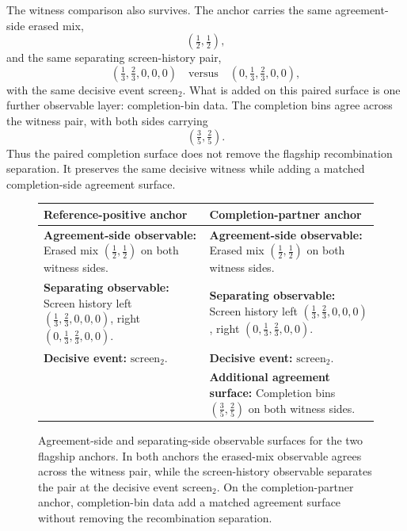 \documentclass[11pt]{article}
\theoremstyle{definition}
\begin{document}
The witness comparison also survives. The anchor carries the same agreement-side erased mix,
\[
(\tfrac12,\tfrac12),
\]
and the same separating screen-history pair,
\[
(\tfrac13,\tfrac23,0,0,0)
\quad\text{versus}\quad
(0,\tfrac13,\tfrac23,0,0),
\]
with the same decisive event \(\mathrm{screen}_2\). What is added on this paired surface is one further observable layer: completion-bin data. The completion bins agree across the witness pair, with both sides carrying
\[
(\tfrac35,\tfrac25).
\]
Thus the paired completion surface does not remove the flagship recombination separation. It preserves the same decisive witness while adding a matched completion-side agreement surface.

\begin{figure}[t]
\centering
\begin{tabular}{p{}p{}}
\toprule
\textbf{Reference-positive anchor} & \textbf{Completion-partner anchor} \\
\midrule
\textbf{Agreement-side observable:} Erased mix \newline $(\tfrac12,\tfrac12)$ on both witness sides. &
\textbf{Agreement-side observable:} Erased mix \newline $(\tfrac12,\tfrac12)$ on both witness sides. \\
\addlinespace
\textbf{Separating observable:} Screen history \newline left $(\tfrac13,\tfrac23,0,0,0)$, \newline right $(0,\tfrac13,\tfrac23,0,0)$. &
\textbf{Separating observable:} Screen history \newline left $(\tfrac13,\tfrac23,0,0,0)$, \newline right $(0,\tfrac13,\tfrac23,0,0)$. \\
\addlinespace
\textbf{Decisive event:} $\mathrm{screen}_2$. &
\textbf{Decisive event:} $\mathrm{screen}_2$. \\
\addlinespace
& \textbf{Additional agreement surface:} Completion bins \newline $(\tfrac35,\tfrac25)$ on both witness sides. \\
\bottomrule
\end{tabular}
\caption{Agreement-side and separating-side observable surfaces for the two flagship anchors. In both anchors the erased-mix observable agrees across the witness pair, while the screen-history observable separates the pair at the decisive event $\mathrm{screen}_2$. On the completion-partner anchor, completion-bin data add a matched agreement surface without removing the recombination separation.}
\label{fig:flagship-anchor-separation}
\end{figure}
 
\end{document}
